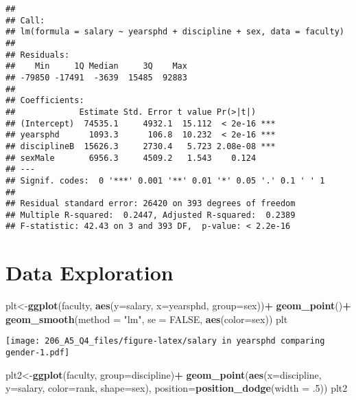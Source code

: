 \documentclass[]{article}
\newenvironment{Shaded}{\begin{snugshade}}{\end{snugshade}}
\newcommand{\KeywordTok}[1]{\textcolor[rgb]{0.13,0.29,0.53}{\textbf{#1}}}
\newcommand{\DataTypeTok}[1]{\textcolor[rgb]{0.13,0.29,0.53}{#1}}
\newcommand{\DecValTok}[1]{\textcolor[rgb]{0.00,0.00,0.81}{#1}}
\newcommand{\StringTok}[1]{\textcolor[rgb]{0.31,0.60,0.02}{#1}}
\newcommand{\OtherTok}[1]{\textcolor[rgb]{0.56,0.35,0.01}{#1}}
\newcommand{\OperatorTok}[1]{\textcolor[rgb]{0.81,0.36,0.00}{\textbf{#1}}}
\newcommand{\NormalTok}[1]{#1}
\begin{document}
\begin{verbatim}
## 
## Call:
## lm(formula = salary ~ yearsphd + discipline + sex, data = faculty)
## 
## Residuals:
##    Min     1Q Median     3Q    Max 
## -79850 -17491  -3639  15485  92883 
## 
## Coefficients:
##             Estimate Std. Error t value Pr(>|t|)    
## (Intercept)  74535.1     4932.1  15.112  < 2e-16 ***
## yearsphd      1093.3      106.8  10.232  < 2e-16 ***
## disciplineB  15626.3     2730.4   5.723 2.08e-08 ***
## sexMale       6956.3     4509.2   1.543    0.124    
## ---
## Signif. codes:  0 '***' 0.001 '**' 0.01 '*' 0.05 '.' 0.1 ' ' 1
## 
## Residual standard error: 26420 on 393 degrees of freedom
## Multiple R-squared:  0.2447, Adjusted R-squared:  0.2389 
## F-statistic: 42.43 on 3 and 393 DF,  p-value: < 2.2e-16
\end{verbatim}

\section{Data Exploration}\label{data-exploration}

\begin{Shaded}
\begin{Highlighting}[]
\NormalTok{plt<-}\KeywordTok{ggplot}\NormalTok{(faculty, }\KeywordTok{aes}\NormalTok{(}\DataTypeTok{y=}\NormalTok{salary, }\DataTypeTok{x=}\NormalTok{yearsphd, }\DataTypeTok{group=}\NormalTok{sex))}\OperatorTok{+}
\StringTok{  }\KeywordTok{geom_point}\NormalTok{()}\OperatorTok{+}
\StringTok{  }\KeywordTok{geom_smooth}\NormalTok{(}\DataTypeTok{method =} \StringTok{"lm"}\NormalTok{, }\DataTypeTok{se =} \OtherTok{FALSE}\NormalTok{, }\KeywordTok{aes}\NormalTok{(}\DataTypeTok{color=}\NormalTok{sex))}
\NormalTok{plt}
\end{Highlighting}
\end{Shaded}

\texttt{[image: 206\_A5\_Q4\_files/figure-latex/salary in yearsphd comparing gender-1.pdf]}

\begin{Shaded}
\begin{Highlighting}[]
\NormalTok{plt2<-}\KeywordTok{ggplot}\NormalTok{(faculty, }\DataTypeTok{group=}\NormalTok{discipline)}\OperatorTok{+}
\StringTok{  }\KeywordTok{geom_point}\NormalTok{(}\KeywordTok{aes}\NormalTok{(}\DataTypeTok{x=}\NormalTok{discipline, }\DataTypeTok{y=}\NormalTok{salary, }\DataTypeTok{color=}\NormalTok{rank, }\DataTypeTok{shape=}\NormalTok{sex), }\DataTypeTok{position=}\KeywordTok{position_dodge}\NormalTok{(}\DataTypeTok{width =}\NormalTok{ .}\DecValTok{5}\NormalTok{))}
\NormalTok{plt2}
\end{Highlighting}
\end{Shaded}
\end{document}
